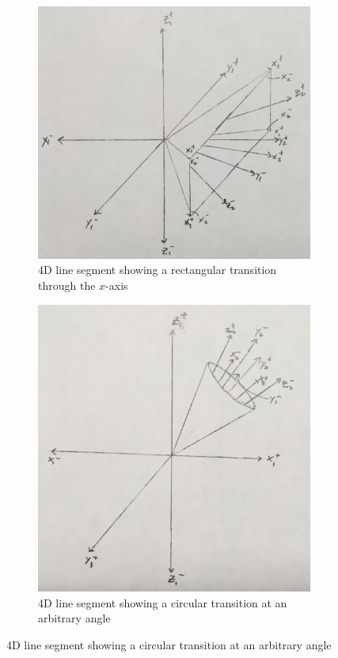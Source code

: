 \documentclass[20pt]{article} %
\begin{document}
\begin{figure}[!htbp]
  	\centering
   	\begin{subfigure}[!p]{0.5\linewidth}
	\centering
    	\includegraphics[width=\linewidth]{./figures/fig5.jpg}
	\caption{4D line segment showing a rectangular transition through the $x$-axis}
	\label{fig:sub1}
   	\end{subfigure}
  	\centering
   	\begin{subfigure}[!p]{0.448\linewidth}
	\centering
    	\includegraphics[width=\linewidth]{./figures/fig6.jpg}
	\caption{4D line segment showing a circular transition at an arbitrary angle}
	\label{fig:sub1}
   	\end{subfigure}
\end{figure} 
\end{document}
